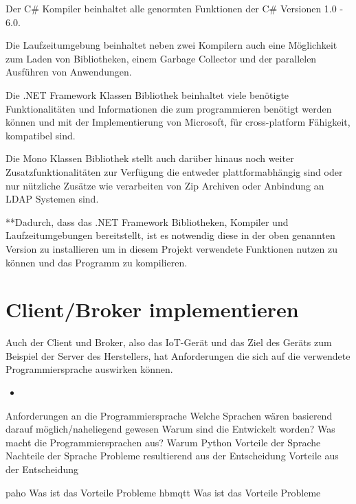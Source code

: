     Der C\# Kompiler beinhaltet alle genormten Funktionen der C\# Versionen 1.0 - 6.0.
    
    Die Laufzeitumgebung beinhaltet neben zwei Kompilern auch eine Möglichkeit zum Laden von Bibliotheken, einem Garbage Collector und der parallelen Ausführen von Anwendungen.

    Die .NET Framework Klassen Bibliothek beinhaltet viele benötigte Funktionalitäten und Informationen die zum programmieren benötigt werden können und mit der Implementierung von Microsoft, für cross-platform Fähigkeit, kompatibel sind.

    Die Mono Klassen Bibliothek stellt auch darüber hinaus noch weiter Zusatzfunktionalitäten zur Verfügung die entweder plattformabhängig sind oder nur nützliche Zusätze wie verarbeiten von Zip Archiven oder Anbindung an LDAP Systemen sind.
    
    **Dadurch, dass das .NET Framework Bibliotheken, Kompiler und Laufzeitumgebungen bereitstellt, ist es notwendig diese in der oben genannten Version zu installieren um in diesem Projekt verwendete Funktionen nutzen zu können und das Programm zu kompilieren.

\section{Client/Broker implementieren}

    Auch der Client und Broker, also das \ac{IoT}-Gerät und das Ziel des Geräts zum Beispiel der Server des Herstellers, hat Anforderungen die sich auf die verwendete Programmiersprache auswirken können.
    \begin{itemize}
        \item 
    \end{itemize}
        Anforderungen an die Programmiersprache
        Welche Sprachen wären basierend darauf möglich/naheliegend gewesen
            Warum sind die Entwickelt worden? 
            Was macht die Programmiersprachen aus?
        Warum Python
            Vorteile der Sprache
            Nachteile der Sprache 
            Probleme resultierend aus der Entscheidung
            Vorteile aus der Entscheidung
    
    paho
        Was ist das
        Vorteile
        Probleme
    hbmqtt
        Was ist das
        Vorteile
        Probleme
            
